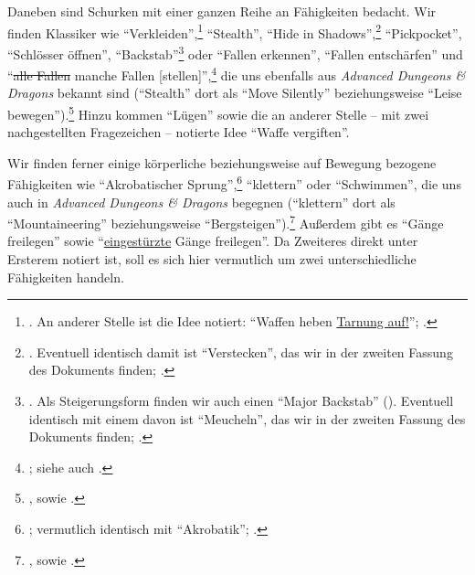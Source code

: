 \documentclass[a5paper,pagesize,numbers=noenddot]{scrbook}
\begin{document}
Daneben sind Schurken mit einer ganzen Reihe an Fähigkeiten bedacht.
Wir finden Klassiker wie \enquote{Verkleiden},\footnote{\autocite[S.~5]{orpheus_gildensystem}. An anderer Stelle ist die Idee notiert: \enquote{Waffen heben \uline{Tarnung auf!}}; \autocite[S.~18]{orpheus_b_scribbles}.} \enquote{Stealth},\autocite[S.~5]{orpheus_gildensystem} \enquote{Hide in Shadows},\footnote{\autocite[S.~5]{orpheus_gildensystem}. Eventuell identisch damit ist \enquote{Verstecken}, das wir in der zweiten Fassung des Dokuments finden; \autocite[S.~3]{orpheus_gildensystem_v2}.} \enquote{Pickpocket},\autocite[S.~9]{orpheus_gildensystem} \enquote{Schlösser öffnen},\autocite[S.~9]{orpheus_gildensystem} \enquote{Backstab}\footnote{\autocite[S.~5]{orpheus_gildensystem}. Als Steigerungsform finden wir auch einen \enquote{Major Backstab} (\autocite[S.~1]{orpheus_gildensystem}). Eventuell identisch mit einem davon ist \enquote{Meucheln}, das wir in der zweiten Fassung des Dokuments finden; \autocite[S.~1, 3]{orpheus_gildensystem_v2}.} oder \enquote{Fallen erkennen}, \enquote{Fallen entschärfen}\autocite[S.~9]{orpheus_gildensystem} und \enquote{\sout{alle Fallen} manche Fallen [stellen]},\footnote{\autocite[S.~13]{orpheus_gildensystem}; siehe auch \autocite[S.~15]{orpheus_gildensystem}.} die uns ebenfalls aus \textit{Advanced Dungeons \& Dragons} bekannt sind (\enquote{Stealth} dort als \enquote{Move Silently} beziehungsweise \enquote{Leise bewegen}).\footnote{\autocite[Vgl.][S.~39\,f., 58, 63]{cook_adnd_1989}, sowie \autocite[S.~56\,ff., 80, 86]{cook_adnd_1996}.}
Hinzu kommen \enquote{Lügen}\autocite[S.~5]{orpheus_gildensystem} sowie die an anderer Stelle -- mit zwei nachgestellten Fragezeichen -- notierte Idee \enquote{Waffe vergiften}.\autocite[S.~8]{orpheus_b_scribbles}

Wir finden ferner einige körperliche beziehungsweise auf Bewegung bezogene Fähigkeiten wie \enquote{Akrobatischer Sprung},\footnote{\autocite[Vgl.][S.~9]{orpheus_gildensystem}; vermutlich identisch mit \enquote{Akrobatik}; \autocite[S.~14]{orpheus_b_scribbles}.} \enquote{klettern}\autocite[S.~9]{orpheus_gildensystem} oder \enquote{Schwimmen}, \autocite[S.~14]{orpheus_b_scribbles} die uns auch in \textit{Advanced Dungeons \& Dragons} begegnen (\enquote{klettern} dort als \enquote{Mountaineering} beziehungsweise \enquote{Bergsteigen}).\footnote{\autocite[Vgl.][S.~61, 64]{cook_adnd_1989}, sowie \autocite[S.~79, 83\,f.]{cook_adnd_1996}.}
Außerdem gibt es \enquote{Gänge freilegen} sowie \enquote{\uline{eingestürzte} Gänge freilegen}.\autocite[S.~5]{orpheus_gildensystem}
Da Zweiteres direkt unter Ersterem notiert ist, soll es sich hier vermutlich um zwei unterschiedliche Fähigkeiten handeln.
\end{document}
